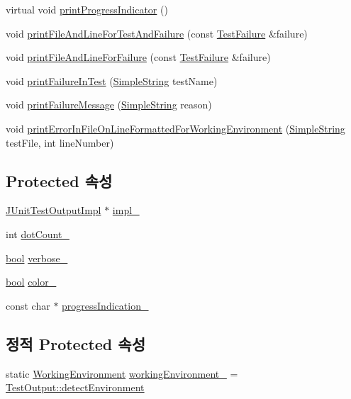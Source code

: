 \begin{DoxyCompactItemize}
\item 
virtual void \hyperlink{class_test_output_a0cd44d3b6da1caa7b8d335ef7580a391}{print\+Progress\+Indicator} ()
\item 
void \hyperlink{class_test_output_ae20c439e68036cc705a86d9a95954168}{print\+File\+And\+Line\+For\+Test\+And\+Failure} (const \hyperlink{class_test_failure}{Test\+Failure} \&failure)
\item 
void \hyperlink{class_test_output_a1d78706f5181a464f5fafb178d231be9}{print\+File\+And\+Line\+For\+Failure} (const \hyperlink{class_test_failure}{Test\+Failure} \&failure)
\item 
void \hyperlink{class_test_output_a1748d410d65b95596df95234742258a3}{print\+Failure\+In\+Test} (\hyperlink{class_simple_string}{Simple\+String} test\+Name)
\item 
void \hyperlink{class_test_output_ab13cdfa930cc1ad29b36b1ab7ff77a99}{print\+Failure\+Message} (\hyperlink{class_simple_string}{Simple\+String} reason)
\item 
void \hyperlink{class_test_output_a56ae5964123fc91c7149a8274aa22db9}{print\+Error\+In\+File\+On\+Line\+Formatted\+For\+Working\+Environment} (\hyperlink{class_simple_string}{Simple\+String} test\+File, int line\+Number)
\end{DoxyCompactItemize}
\subsection*{Protected 속성}
\begin{DoxyCompactItemize}
\item 
\hyperlink{struct_j_unit_test_output_impl}{J\+Unit\+Test\+Output\+Impl} $\ast$ \hyperlink{class_j_unit_test_output_a123a6133cd44cdaa2c63a519f9fb56f4}{impl\+\_\+}
\item 
int \hyperlink{class_test_output_a3c1c7e8cf0310d384198f0dc504251c6}{dot\+Count\+\_\+}
\item 
\hyperlink{avb__gptp_8h_af6a258d8f3ee5206d682d799316314b1}{bool} \hyperlink{class_test_output_a86126da532c138842a42d8e9a52b0806}{verbose\+\_\+}
\item 
\hyperlink{avb__gptp_8h_af6a258d8f3ee5206d682d799316314b1}{bool} \hyperlink{class_test_output_adda8c1875964c3b80ed1c77b585fc756}{color\+\_\+}
\item 
const char $\ast$ \hyperlink{class_test_output_a4cbc8ea3886624399ab3879767d4f018}{progress\+Indication\+\_\+}
\end{DoxyCompactItemize}
\subsection*{정적 Protected 속성}
\begin{DoxyCompactItemize}
\item 
static \hyperlink{class_test_output_a0541851f863713454486a9fb3080f766}{Working\+Environment} \hyperlink{class_test_output_a8b622cfce4b95599cd31b61a777d68ef}{working\+Environment\+\_\+} = \hyperlink{class_test_output_a0541851f863713454486a9fb3080f766a3f11f791db94db142e33c3c75442ed10}{Test\+Output\+::detect\+Environment}
\end{DoxyCompactItemize}


